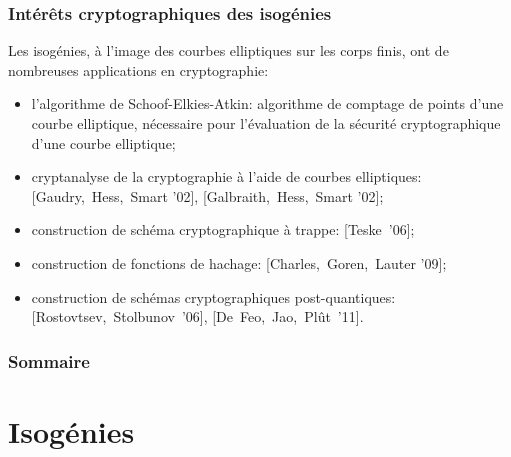 \documentclass[10pt,a4paper]{beamer}
\theoremstyle{plain}
\theoremstyle{definition}
\theoremstyle{definition}
\theoremstyle{definition}
\theoremstyle{definition}
\theoremstyle{remark}
\theoremstyle{remark}
\theoremstyle{definition}
\newcommand{\bluebox}[2]{
\setbeamercolor{upperblue}{fg=white,bg=blue}
\setbeamercolor{lowercol}{fg=black,bg=pacificcream}

\begin{beamerboxesrounded}[upper=upperblue,lower=lowercol,shadow=true]{
#1 }  #2
\end{beamerboxesrounded} }
\begin{document}
\begin{frame}
\frametitle{Intérêts cryptographiques des isogénies}

Les isogénies, à l'image des courbes elliptiques sur les corps finis, ont de nombreuses 
applications en cryptographie: 
\begin{itemize}
\item l'algorithme de Schoof-Elkies-Atkin: algorithme de comptage de points
d'une courbe elliptique, nécessaire pour l'évaluation de la sécurité 
cryptographique d'une courbe elliptique;
\pause
\item cryptanalyse de la cryptographie à l'aide de courbes elliptiques: [Gaudry,~Hess,~Smart '02], [Galbraith,~Hess,~Smart '02];
\pause
\item construction de schéma cryptographique à trappe: [Teske~'06];
\pause
\item construction de fonctions de hachage: [Charles,~Goren,~Lauter '09];
\pause
\item construction de schémas cryptographiques post-quantiques: [Rostovtsev,~Stolbunov~'06], [De~Feo,~Jao,~Pl\^ut~'11].
\end{itemize}
\end{frame}

\begin{frame}
\frametitle{Sommaire}
\tableofcontents
\end{frame}

\section{Isogénies}
\end{document}
